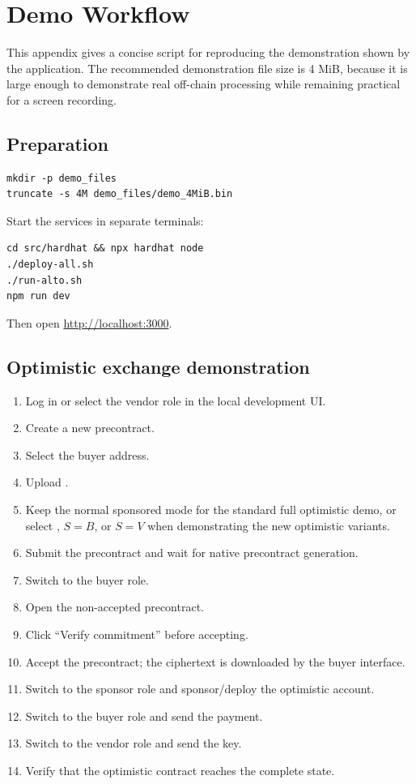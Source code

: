 \chapter{Demo Workflow}
\label{app:demo-workflow}

This appendix gives a concise script for reproducing the demonstration shown by the
application. The recommended demonstration file size is 4 MiB, because it is large enough
to demonstrate real off-chain processing while remaining practical for a screen recording.

\section{Preparation}

\begin{verbatim}
mkdir -p demo_files
truncate -s 4M demo_files/demo_4MiB.bin
\end{verbatim}

Start the services in separate terminals:

\begin{verbatim}
cd src/hardhat && npx hardhat node
./deploy-all.sh
./run-alto.sh
npm run dev
\end{verbatim}

Then open \url{http://localhost:3000}.

\section{Optimistic exchange demonstration}

\begin{enumerate}
  \item Log in or select the vendor role in the local development UI.
  \item Create a new precontract.
  \item Select the buyer address.
  \item Upload .
  \item Keep the normal sponsored mode for the standard full optimistic demo, or select
  \simsox{}, \(S=B\), or \(S=V\) when demonstrating the new optimistic variants.
  \item Submit the precontract and wait for native precontract generation.
  \item Switch to the buyer role.
  \item Open the non-accepted precontract.
  \item Click ``Verify commitment'' before accepting.
  \item Accept the precontract; the ciphertext is downloaded by the buyer interface.
  \item Switch to the sponsor role and sponsor/deploy the optimistic account.
  \item Switch to the buyer role and send the payment.
  \item Switch to the vendor role and send the key.
  \item Verify that the optimistic contract reaches the complete state.
\end{enumerate}

